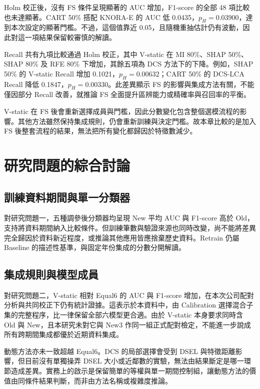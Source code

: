 Holm 校正後，沒有 FS 條件呈現顯著的 AUC 增加，F1-score 的全部 48 項比較也未達顯著。CART 50\% 搭配 KNORA-E 的 AUC 低 0.0435，\(p_H=0.03900\)，達到本次設定的顯著門檻。不過，這個值靠近 0.05，且隨機重抽估計仍有波動，因此對這一項結果保留較審慎的解讀。

Recall 共有九項比較通過 Holm 校正，其中 V-static 在 MI 80\%、SHAP 50\%、SHAP 80\% 及 RFE 80\% 下增加，其餘五項為 DCS 方法下的下降。例如，SHAP 50\% 的 V-static Recall 增加 0.1021，\(p_H=0.00632\)；CART 50\% 的 DCS-LCA Recall 降低 0.1847，\(p_H=0.00330\)。此差異顯示 FS 的影響與集成方法有關，不能僅因部分 Recall 改善，就推論 FS 全面提升區辨能力或精確率與召回率的平衡。

V-static 在 FS 後會重新選擇成員與門檻，因此分數變化包含整個選模流程的影響。其他方法雖然保持集成規則，仍會重新訓練與決定門檻。故本章比較的是加入 FS 後整套流程的結果，無法把所有變化都歸因於特徵數減少。

\section{研究問題的綜合討論}\label{sec:results-discussion}

\subsection{訓練資料期間與單一分類器}

對研究問題一，五種調參後分類器均呈現 New 平均 AUC 與 F1-score 高於 Old，支持將資料期間納入比較條件。但訓練筆數與驗證來源也同時改變，尚不能將差異完全歸因於資料新近程度，或推論其他應用皆應捨棄歷史資料。Retrain 仍屬 Baseline 的描述性基準，與固定年份集成的分數分開解讀。

\subsection{集成規則與模型成員}

對研究問題二，V-static 相對 Equal6 的 AUC 與 F1-score 增加，在本次公司配對分析與共同校正下仍有統計證據。這表示於本資料中，由 Calibration 選擇混合子集的完整程序，比一律保留全部六模型更合適。由於 V-static 本身要求同時含 Old 與 New，且本研究未對它與 New3 作同一組正式配對檢定，不能進一步說成所有跨期間集成都優於近期資料集成。

動態方法亦未一致超越 Equal6。DCS 的局部選擇會受到 DSEL 與特徵距離影響，但目前沒有單獨操弄 DSEL 大小或近鄰數的實驗，無法由結果斷定是哪一環節造成差異。實務上的啟示是保留簡單的等權與單一期間控制組，讓動態方法的價值由同條件結果判斷，而非由方法名稱或複雜度推論。

